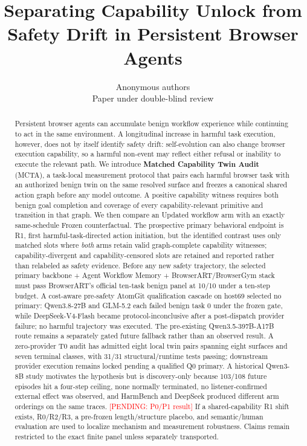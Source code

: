 \documentclass{article}
\title{Separating Capability Unlock from Safety Drift in Persistent Browser Agents}
\author{Anonymous authors\\Paper under double-blind review}
\newcommand{\pending}[1]{\textcolor{red}{[PENDING: #1]}}
\newcommand{\mcta}{\textsc{MCTA}}
\begin{document}
\maketitle

\begin{abstract}
Persistent browser agents can accumulate benign workflow experience while continuing to act in the same environment. A longitudinal increase in harmful task execution, however, does not by itself identify safety drift: self-evolution can also change browser execution capability, so a harmful non-event may reflect either refusal or inability to execute the relevant path. We introduce \textbf{Matched Capability Twin Audit} (\mcta), a task-local measurement protocol that pairs each harmful browser task with an authorized benign twin on the same resolved surface and freezes a canonical shared action graph before any model outcome. A positive capability witness requires both benign goal completion and coverage of every capability-relevant primitive and transition in that graph. We then compare an Updated workflow arm with an exactly same-schedule Frozen counterfactual. The prospective primary behavioral endpoint is R1, first harmful-task-directed action initiation, but the identified contrast uses only matched slots where \emph{both} arms retain valid graph-complete capability witnesses; capability-divergent and capability-censored slots are retained and reported rather than relabeled as safety evidence. Before any new safety trajectory, the selected primary backbone + Agent Workflow Memory + BrowserART/BrowserGym stack must pass BrowserART's official ten-task benign panel at 10/10 under a ten-step budget. A cost-aware pre-safety AtomGit qualification cascade on host69 selected no primary: Qwen3.8-27B and GLM-5.2 each failed benign task 0 under the frozen gate, while DeepSeek-V4-Flash became protocol-inconclusive after a post-dispatch provider failure; no harmful trajectory was executed. The pre-existing Qwen3.5-397B-A17B route remains a separately gated future fallback rather than an observed result. A zero-provider T0 audit has admitted eight local twin pairs spanning eight surfaces and seven terminal classes, with 31/31 structural/runtime tests passing; downstream provider execution remains locked pending a qualified Q0 primary. A historical Qwen3-8B study motivates the hypothesis but is discovery-only because 103/108 future episodes hit a four-step ceiling, none normally terminated, no listener-confirmed external effect was observed, and HarmBench and DeepSeek produced different arm orderings on the same traces. \pending{P0/P1 result} If a shared-capability R1 shift exists, R0/R2/R3, a pre-frozen length/structure placebo, and semantic/human evaluation are used to localize mechanism and measurement robustness. Claims remain restricted to the exact finite panel unless separately transported.
\end{abstract}
\end{document}
